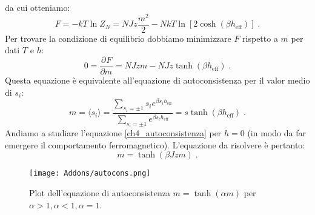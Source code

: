 \documentclass[10pt,a4paper]{report}
\theoremstyle{definition}
\newcommand{\pdev}[3][]{\frac{\partial^{#1} #2}{\partial #3^{#1}}}
\numberwithin{equation}{section}
\newcommand{\bra}{\langle}
\newcommand{\ket}{\rangle}
\begin{document}
da cui otteniamo:
\begin{equation}
F=-kT\ln Z_N=NJz\frac{m^2}{2}-NkT\ln\left[2\cosh(\beta h_{\mathrm{eff}})\right]\;.
\end{equation}
Per trovare la condizione di equilibrio dobbiamo minimizzare $F$ rispetto a $m$ per dati $T$ e $h$:
\begin{equation}
0=\pdev{F}{m}=NJzm-NJz\tanh(\beta h_{\mathrm{eff}})\;.
\end{equation}
Questa equazione è equivalente all'equazione di autoconsistenza per il valor medio di $s_i$:
\begin{equation}
m=\bra s_i\ket=\frac{\sum_{s_i=\pm 1}s_ie^{\beta s_ih_{\mathrm{eff}}}}{\sum_{s_i=\pm 1}e^{\beta s_ih_{\mathrm{eff}}}}=s\tanh(\beta h_{\mathrm{eff}})\;. \label{ch4_autoconsistenza}
\end{equation}
Andiamo a studiare l'equazione \eqref{ch4_autoconsistenza} per $h=0$ (in modo da far emergere il comportamento ferromagnetico). L'equazione da risolvere è pertanto:
\begin{equation}
m=\tanh(\beta Jzm)\;.
\end{equation}


\begin{figure}[h]
\centering
\texttt{[image: Addons/autocons.png]}
\caption{\footnotesize{Plot dell'equazione di autoconsistenza $m=\tanh(\alpha m)$ per $\alpha>1,\alpha<1,\alpha=1$.}}
\end{figure}
\end{document}

